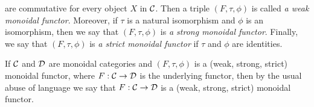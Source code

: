 \begin{definition}
\begin{center}
\end{center}
are commutative for every object $X$ in ${\mathcal C}$. Then a triple $(F,\tau,\phi)$ is called \textit{a weak monoidal functor}. Moreover, if $\tau$ is a natural isomorphism and $\phi$ is an isomorphism, then we say that $(F,\tau,\phi)$ is \textit{a strong monoidal functor}. Finally, we say that $(F,\tau,\phi)$ is \textit{a strict monoidal functor} if $\tau$ and $\phi$ are identities.
\end{definition}
\noindent
If ${\mathcal C}$ and ${\mathcal D}$ are monoidal categories and $(F,\tau,\phi)$ is a (weak, strong, strict) monoidal functor, where $F:{\mathcal C}\rightarrow {\mathcal D}$ is the underlying functor, then by the usual abuse of language we say that $F:{\mathcal C}\rightarrow {\mathcal D}$ is a (weak, strong, strict) monoidal functor.

